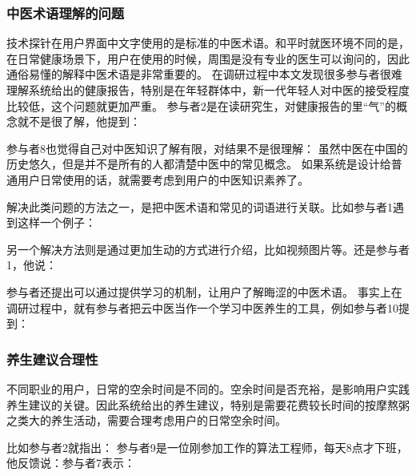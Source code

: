 \subsubsection{中医术语理解的问题}

技术探针在用户界面中文字使用的是标准的中医术语。和平时就医环境不同的是，在日常健康场景下，用户在使用的时候，周围是没有专业的医生可以询问的，因此通俗易懂的解释中医术语是非常重要的。
在调研过程中本文发现很多参与者很难理解系统给出的健康报告，特别是在年轻群体中，新一代年轻人对中医的接受程度比较低，这个问题就更加严重。
参与者2是在读研究生，对健康报告的里“气”的概念就不是很了解，他提到：

参与者8也觉得自己对中医知识了解有限，对结果不是很理解：
虽然中医在中国的历史悠久，但是并不是所有的人都清楚中医中的常见概念。 如果系统是设计给普通用户日常使用的话，就需要考虑到用户的中医知识素养了。

解决此类问题的方法之一，是把中医术语和常见的词语进行关联。比如参与者1遇到这样一个例子：

另一个解决方法则是通过更加生动的方式进行介绍，比如视频图片等。还是参与者1，他说：

参与者还提出可以通过提供学习的机制，让用户了解晦涩的中医术语。
事实上在调研过程中，就有参与者把云中医当作一个学习中医养生的工具，例如参与者10提到：

\subsubsection{养生建议合理性}

不同职业的用户，日常的空余时间是不同的。空余时间是否充裕，是影响用户实践养生建议的关键。因此系统给出的养生建议，特别是需要花费较长时间的按摩熬粥之类大的养生活动，需要合理考虑用户的日常空余时间。

比如参与者2就指出：
参与者9是一位刚参加工作的算法工程师，每天8点才下班，他反馈说：参与者7表示：


